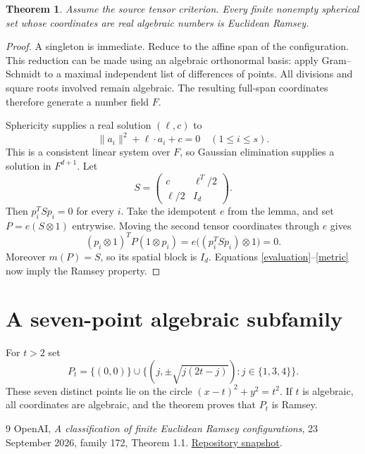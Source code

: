\documentclass[11pt,a4paper]{article}
\newtheorem{theorem}{Theorem}
\begin{document}
\begin{theorem}
Assume the source tensor criterion. Every finite nonempty spherical set whose coordinates are real algebraic numbers is Euclidean Ramsey.
\end{theorem}
\begin{proof}
A singleton is immediate. Reduce to the affine span of the configuration. This reduction can be made using an algebraic orthonormal basis: apply Gram--Schmidt to a maximal independent list of differences of points. All divisions and square roots involved remain algebraic. The resulting full-span coordinates therefore generate a number field $F$.

Sphericity supplies a real solution $(\ell,c)$ to
\[
 \|a_i\|^2+\ell\cdot a_i+c=0\quad(1\le i\le s).
\]
This is a consistent linear system over $F$, so Gaussian elimination supplies a solution in $F^{d+1}$. Let
\[
 S=\begin{pmatrix}c&\ell^T/2\\ \ell/2&I_d\end{pmatrix}.
\]
Then $p_i^TSp_i=0$ for every $i$. Take the idempotent $e$ from the lemma, and set $P=e(S\otimes1)$ entrywise. Moving the second tensor coordinates through $e$ gives
\[
 (p_i\otimes1)^TP(1\otimes p_i)
 =e\bigl((p_i^TSp_i)\otimes1\bigr)=0.
\]
Moreover $m(P)=S$, so its spatial block is $I_d$. Equations \eqref{evaluation}--\eqref{metric} now imply the Ramsey property.
\end{proof}

\section{A seven-point algebraic subfamily}
For $t>2$ set
\[
 P_t=\{(0,0)\}\cup
 \{(j,\pm\sqrt{j(2t-j)}):j\in\{1,3,4\}\}.
\]
These seven distinct points lie on the circle $(x-t)^2+y^2=t^2$. If $t$ is algebraic, all coordinates are algebraic, and the theorem proves that $P_t$ is Ramsey.

\begin{thebibliography}{9}
 OpenAI, \emph{A classification of finite Euclidean Ramsey configurations}, 23 September 2026, family 172, Theorem 1.1. \href{https://github.com/openai/math/blob/adc7f1241b42e322a6451854ab7e4b4c146bf78a/preprints/A-classification-of-finite-Euclidean-Ramsey-configurations-September-23-2026/paper.pdf}{Repository snapshot}.
\end{thebibliography}
\end{document}
